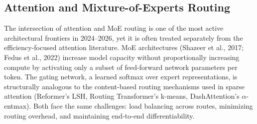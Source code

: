 \documentclass[10pt,twocolumn]{article}
\begin{document}
\subsection{Attention and Mixture-of-Experts Routing}\label{attention-and-mixture-of-experts-routing}

The intersection of attention and MoE routing is one of the most active architectural frontiers in 2024--2026, yet it is often treated separately from the efficiency-focused attention literature. MoE architectures (Shazeer et al., 2017; Fedus et al., 2022) increase model capacity without proportionally increasing compute by activating only a subset of feed-forward network parameters per token. The gating network, a learned softmax over expert representations, is structurally analogous to the content-based routing mechanisms used in sparse attention (Reformer's LSH, Routing Transformer's k-means, DashAttention's $\alpha$-entmax). Both face the same challenges: load balancing across routes, minimizing routing overhead, and maintaining end-to-end differentiability.
\end{document}
